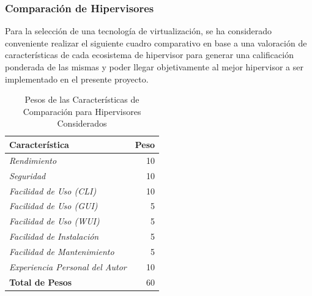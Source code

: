 \subsubsection{Comparación de Hipervisores}
Para la selección de una tecnología de virtualización, se ha considerado conveniente realizar el siguiente cuadro comparativo en base a una valoración de características de cada ecosistema de hipervisor para generar una calificación ponderada de las mismas y poder llegar objetivamente al mejor hipervisor a ser implementado en el presente proyecto.

\begin{table}
	\centering
	\begin{tabular}{|l|r|}
    	\hline
		\textbf{Característica} & \textbf{Peso} \\
        \hline
        \textit{Rendimiento} & 10 \\
        \textit{Seguridad} & 10 \\
        \textit{Facilidad de Uso (CLI)} & 10 \\
        \textit{Facilidad de Uso (GUI)} & 5 \\
        \textit{Facilidad de Uso (WUI)} & 5 \\
        \textit{Facilidad de Instalación} & 5 \\
        \textit{Facilidad de Mantenimiento} & 5 \\
        \textit{Experiencia Personal del Autor} & 10 \\
        \hline
        \textbf{Total de Pesos} & 60 \\
        \hline
	\end{tabular}
    \caption{Pesos de las Características de Comparación para Hipervisores Considerados}
    \label{tab:hipervisor-compar-pesos}
\end{table}


